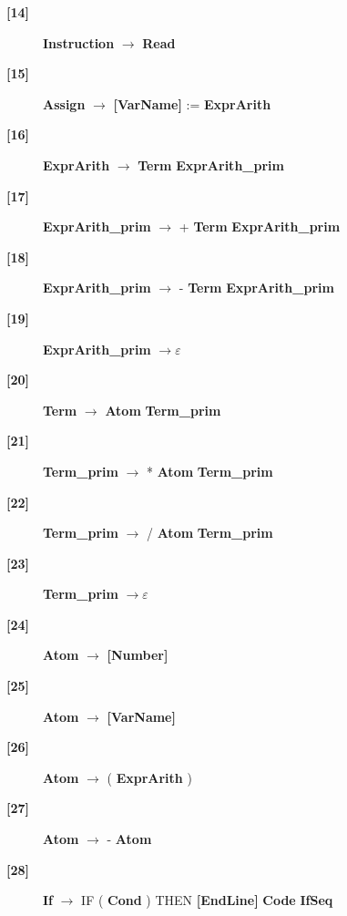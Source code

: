 \documentclass[12pt]{article}
\begin{document}
\begin{description}
	\item[\textbf{[14]}]{ \textbf{\textlangle{}Instruction\textrangle{}}  $\rightarrow$ \textbf{\textlangle{}Read\textrangle{}} }
	\item[\textbf{[15]}]{ \textbf{\textlangle{}Assign\textrangle{}}  $\rightarrow$ \textbf{[VarName]} := \textbf{\textlangle{}ExprArith\textrangle{}} }
	\item[\textbf{[16]}]{ \textbf{\textlangle{}ExprArith\textrangle{}}  $\rightarrow$ \textbf{\textlangle{}Term\textrangle{}}  \textbf{\textlangle{}ExprArith\_prim\textrangle{}} }
	\item[\textbf{[17]}]{ \textbf{\textlangle{}ExprArith\_prim\textrangle{}}  $\rightarrow$ + \textbf{\textlangle{}Term\textrangle{}}  \textbf{\textlangle{}ExprArith\_prim\textrangle{}} }
	\item[\textbf{[18]}]{ \textbf{\textlangle{}ExprArith\_prim\textrangle{}}  $\rightarrow$ - \textbf{\textlangle{}Term\textrangle{}}  \textbf{\textlangle{}ExprArith\_prim\textrangle{}} }
	\item[\textbf{[19]}]{ \textbf{\textlangle{}ExprArith\_prim\textrangle{}}  $\rightarrow \varepsilon$}
	\item[\textbf{[20]}]{ \textbf{\textlangle{}Term\textrangle{}}  $\rightarrow$ \textbf{\textlangle{}Atom\textrangle{}}  \textbf{\textlangle{}Term\_prim\textrangle{}} }
	\item[\textbf{[21]}]{ \textbf{\textlangle{}Term\_prim\textrangle{}}  $\rightarrow$ * \textbf{\textlangle{}Atom\textrangle{}}  \textbf{\textlangle{}Term\_prim\textrangle{}} }
	\item[\textbf{[22]}]{ \textbf{\textlangle{}Term\_prim\textrangle{}}  $\rightarrow$ / \textbf{\textlangle{}Atom\textrangle{}}  \textbf{\textlangle{}Term\_prim\textrangle{}} }
	\item[\textbf{[23]}]{ \textbf{\textlangle{}Term\_prim\textrangle{}}  $\rightarrow \varepsilon$}
	\item[\textbf{[24]}]{ \textbf{\textlangle{}Atom\textrangle{}}  $\rightarrow$ \textbf{[Number]}}
	\item[\textbf{[25]}]{ \textbf{\textlangle{}Atom\textrangle{}}  $\rightarrow$ \textbf{[VarName]}}
	\item[\textbf{[26]}]{ \textbf{\textlangle{}Atom\textrangle{}}  $\rightarrow$ ( \textbf{\textlangle{}ExprArith\textrangle{}}  )}
	\item[\textbf{[27]}]{ \textbf{\textlangle{}Atom\textrangle{}}  $\rightarrow$ - \textbf{\textlangle{}Atom\textrangle{}} }
	\item[\textbf{[28]}]{ \textbf{\textlangle{}If\textrangle{}}  $\rightarrow$ IF ( \textbf{\textlangle{}Cond\textrangle{}}  ) THEN \textbf{[EndLine]} \textbf{\textlangle{}Code\textrangle{}}  \textbf{\textlangle{}IfSeq\textrangle{}} }

\end{description}
\end{document}
